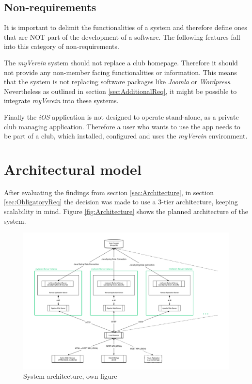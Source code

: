\subsection{Non-requirements} %

It is important to delimit the functionalities of a system and therefore define ones that are NOT part of the development of a software. The following features fall into this category of non-requirements.

The \emph{myVerein} system should not replace a club homepage. Therefore it should not provide any non-member facing functionalities or information. This means that the system is not replacing software packages like \emph{Joomla} or \emph{Wordpress}. Nevertheless as outlined in section \vref{sec:AdditionalReq}, it might be possible to integrate \emph{myVerein} into these systems.

Finally the \emph{iOS} application is not designed to operate stand-alone, as a private club managing application. Therefore a user who wants to use the app needs to be part of a club, which installed, configured and uses the \emph{myVerein} environment.

\section{Architectural model}
After evaluating the findings from section \vref{sec:Architecture}, in section \vref{sec:ObligatoryReq} the decision was made to use a 3-tier architecture, keeping scalability in mind. Figure \vref{fig:Architecture} shows the planned architecture of the system. 

\begin{figure}[h]
  	\centering
  	\includegraphics[width=0.95\linewidth]{./images/architecture.png}
  	\caption{System architecture, own figure}
	\label{fig:Architecture}
\end{figure}

